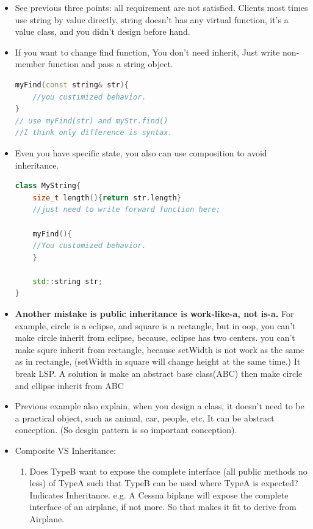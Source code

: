 \documentclass[a4paper,11pt,twoside]{book}
\begin{document}
\begin{itemize}
	\item See previous three points: all requirement are not satisfied. Clients most times use string by value directly, string doesn't has any virtual function, it's a value class, and you didn't design before hand.
	
\item If you want to change find function, You don't need inherit,  Just write non-member function and pass a string object.
\begin{lstlisting}[frame=single, language=c++]
myFind(const string& str){
	//you custimized behavior.
}
// use myFind(str) and myStr.find()
//I think only difference is syntax.
\end{lstlisting}
	
\item Even you have specific state, you also can use composition to avoid inheritance.
\begin{lstlisting}[frame=single, language=c++]
class MyString{
	size_t length(){return str.length}
	//just need to write forward function here;
	
	myFind(){
	//You customized behavior.
	}
	
	std::string str;
}
	\end{lstlisting}
	
	\item \textbf{Another mistake is public inheritance is work-like-a, not is-a.} For example, circle is a eclipse, and square is a rectangle, but in oop, you can't make circle inherit from eclipse, because, eclipse has two centers.  you can't make squre inherit from rectangle, because setWidth is not work as the same as in rectangle, (setWidth in square will change height at the same time.) It break LSP.  A solution is make an abstract base class(ABC) then make circle and ellipse inherit from ABC
	
	
	\item Previous example also explain, when you design a class, it doesn't need to be a practical object, such as animal, car, people, etc.  It can be abstract conception.  (So desgin pattern is so important conception).
	
	\item Composite VS Inheritance:
	\begin{enumerate}
		\item Does TypeB want to expose the complete interface (all public methods no less) of TypeA such that TypeB can be used where TypeA is expected? Indicates Inheritance. e.g. A Cessna biplane will expose the complete interface of an airplane, if not more. So that makes it fit to derive from Airplane.
		

\end{enumerate}
\end{itemize}
\end{document}
